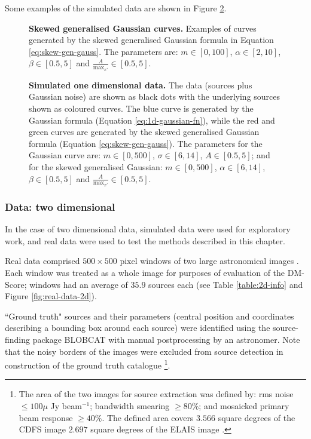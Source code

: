 Some examples of the simulated data are shown in Figure \ref{fig:1d-data-egs}. 

\begin{figure}
\centering
{}
\caption[Skewed generalised Gaussian curves]{\textbf{Skewed generalised Gaussian curves.} Examples of curves generated by the skewed generalised Gaussian formula in Equation \ref{eq:skew-gen-gauss}. The parameters are: $m \in [0,100]$, $\alpha \in [2,10]$, $\beta \in [0.5,5]$ and $\frac{A}{\text{max}_{x'}} \in [0.5,5]$.}
\label{fig:skew-gen-gauss}
\end{figure}

\begin{figure}
\centering
{}
\caption[Simulated one dimensional data]{\textbf{Simulated one dimensional data.} The data (sources plus Gaussian noise) are shown as black dots with the underlying sources shown as coloured curves. The blue curve is generated by the Gaussian formula (Equation \ref{eq:1d-gaussian-fn}), while the red and green curves are generated by the skewed generalised Gaussian formula (Equation \ref{eq:skew-gen-gauss}). The parameters for the Gaussian curve are: $m \in [0,500]$, $\sigma \in [6,14]$, $A \in [0.5,5]$; and for the skewed generalised Gaussian: $m \in [0,500]$, $\alpha \in [6,14]$, $\beta \in [0.5,5]$ and $\frac{A}{\text{max}_{x'}} \in [0.5,5]$.}
\label{fig:1d-data-egs}
\end{figure}

\subsubsection{Data: two dimensional}
In the case of two dimensional data, simulated data were used for exploratory work, and real data were used to test the methods described in this chapter.

Real data comprised $500 \times 500$ pixel windows of two large astronomical images \cite{norris2006deep}. Each window was treated as a whole image for purposes of evaluation of the DM-Score; windows had an average of $35.9$ sources each (see Table \ref{table:2d-info} and Figure \ref{fig:real-data-2d}). 

``Ground truth" sources and their parameters (central position and coordinates describing a bounding box around each source) were identified using the source-finding package BLOBCAT \cite{hales2012blobcat} with manual postprocessing by an astronomer. Note that the noisy borders of the images were excluded from source detection in construction of the ground truth catalogue \footnote{The area of the two images for source extraction was deﬁned by: rms noise $\le 100 \mu$ Jy beam$^{−1}$; bandwidth smearing $ \ge 80\%$; and mosaicked primary beam response $\ge 40\%$. The defined area covers $3.566$ square degrees of the CDFS image $2.697$ square degrees of the ELAIS image \cite{banfield2013australia}.}.

